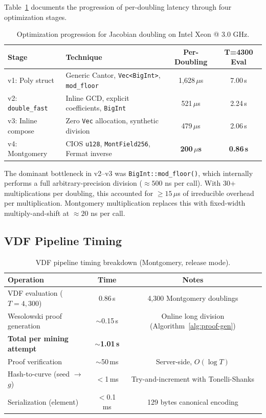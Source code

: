 \documentclass[11pt,a4paper]{article}
\begin{document}
Table~\ref{tab:optimization} documents the progression of per-doubling latency through four optimization stages.

\begin{table}[h]
\centering
\begin{tabular}{llcc}
\toprule
\textbf{Stage} & \textbf{Technique} & \textbf{Per-Doubling} & \textbf{T=4300 Eval} \\
\midrule
v1: Poly struct & Generic Cantor, \texttt{Vec<BigInt>}, \texttt{mod\_floor} & 1{,}628\,$\mu$s & 7.00\,s \\
v2: \texttt{double\_fast} & Inline GCD, explicit coefficients, \texttt{BigInt} & 521\,$\mu$s & 2.24\,s \\
v3: Inline compose & Zero \texttt{Vec} allocation, synthetic division & 479\,$\mu$s & 2.06\,s \\
v4: Montgomery & CIOS \texttt{u128}, \texttt{MontField256}, Fermat inverse & \textbf{200\,$\mu$s} & \textbf{0.86\,s} \\
\bottomrule
\end{tabular}
\caption{Optimization progression for Jacobian doubling on Intel Xeon @ 3.0 GHz.}
\label{tab:optimization}
\end{table}

The dominant bottleneck in v2--v3 was \texttt{BigInt::mod\_floor()}, which internally performs a full arbitrary-precision division ($\approx 500$ ns per call). With 30+ multiplications per doubling, this accounted for $\geq 15$\,$\mu$s of irreducible overhead per multiplication. Montgomery multiplication replaces this with fixed-width multiply-and-shift at $\approx 20$ ns per call.

\subsection{VDF Pipeline Timing}

\begin{table}[h]
\centering
\begin{tabular}{lcc}
\toprule
\textbf{Operation} & \textbf{Time} & \textbf{Notes} \\
\midrule
VDF evaluation ($T = 4{,}300$) & 0.86\,s & 4,300 Montgomery doublings \\
Wesolowski proof generation & $\sim$0.15\,s & Online long division (Algorithm~\ref{alg:proof-gen}) \\
\midrule
\textbf{Total per mining attempt} & $\sim$\textbf{1.01\,s} & \\
\midrule
Proof verification & $\sim$50\,ms & Server-side, $O(\log T)$ \\
Hash-to-curve (seed $\to$ $g$) & $<$1\,ms & Try-and-increment with Tonelli-Shanks \\
Serialization (element) & $<$0.1\,ms & 129 bytes canonical encoding \\
\bottomrule
\end{tabular}
\caption{VDF pipeline timing breakdown (Montgomery, release mode).}
\label{tab:pipeline}
\end{table}
\end{document}
